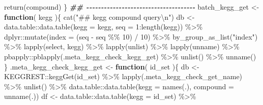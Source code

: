 \documentclass[
]{article}
\newenvironment{Shaded}{\begin{snugshade}}{\end{snugshade}}
\newcommand{\AttributeTok}[1]{\textcolor[rgb]{0.77,0.63,0.00}{#1}}
\newcommand{\ControlFlowTok}[1]{\textcolor[rgb]{0.13,0.29,0.53}{\textbf{#1}}}
\newcommand{\DecValTok}[1]{\textcolor[rgb]{0.00,0.00,0.81}{#1}}
\newcommand{\DocumentationTok}[1]{\textcolor[rgb]{0.56,0.35,0.01}{\textbf{\textit{#1}}}}
\newcommand{\FunctionTok}[1]{\textcolor[rgb]{0.00,0.00,0.00}{#1}}
\newcommand{\NormalTok}[1]{#1}
\newcommand{\OtherTok}[1]{\textcolor[rgb]{0.56,0.35,0.01}{#1}}
\newcommand{\SpecialCharTok}[1]{\textcolor[rgb]{0.00,0.00,0.00}{#1}}
\newcommand{\StringTok}[1]{\textcolor[rgb]{0.31,0.60,0.02}{#1}}
\begin{document}
\begin{Shaded}
\begin{Highlighting}[]
    \FunctionTok{return}\NormalTok{(compound)}
\NormalTok{  \}}
\DocumentationTok{\#\# {-}{-}{-}{-}{-}{-}{-}{-}{-}{-}{-}{-}{-}{-}{-}{-}{-}{-}{-}{-}{-}{-}{-}{-}{-}{-}{-}{-}{-}{-}{-}{-}{-}{-}{-}{-}{-} }
\NormalTok{batch\_kegg\_get }\OtherTok{\textless{}{-}} 
  \ControlFlowTok{function}\NormalTok{(}
\NormalTok{           kegg}
\NormalTok{           )\{}
    \FunctionTok{cat}\NormalTok{(}\StringTok{"\#\# kegg compound query}\SpecialCharTok{\textbackslash{}n}\StringTok{"}\NormalTok{)}
\NormalTok{    db }\OtherTok{\textless{}{-}}\NormalTok{ data.table}\SpecialCharTok{::}\FunctionTok{data.table}\NormalTok{(}\AttributeTok{kegg =}\NormalTok{ kegg, }\AttributeTok{seq =} \DecValTok{1}\SpecialCharTok{:}\FunctionTok{length}\NormalTok{(kegg)) }\SpecialCharTok{\%\textgreater{}\%} 
\NormalTok{      dplyr}\SpecialCharTok{::}\FunctionTok{mutate}\NormalTok{(}\AttributeTok{index =}\NormalTok{ (seq }\SpecialCharTok{{-}}\NormalTok{ seq }\SpecialCharTok{\%\%} \DecValTok{10}\NormalTok{) }\SpecialCharTok{/} \DecValTok{10}\NormalTok{) }\SpecialCharTok{\%\textgreater{}\%}
      \FunctionTok{by\_group\_as\_list}\NormalTok{(}\StringTok{"index"}\NormalTok{) }\SpecialCharTok{\%\textgreater{}\%}
      \FunctionTok{lapply}\NormalTok{(select, kegg) }\SpecialCharTok{\%\textgreater{}\%} 
      \FunctionTok{lapply}\NormalTok{(unlist) }\SpecialCharTok{\%\textgreater{}\%} 
      \FunctionTok{lapply}\NormalTok{(unname) }\SpecialCharTok{\%\textgreater{}\%} 
\NormalTok{      pbapply}\SpecialCharTok{::}\FunctionTok{pblapply}\NormalTok{(.meta\_kegg\_check\_kegg\_get) }\SpecialCharTok{\%\textgreater{}\%}
      \FunctionTok{unlist}\NormalTok{() }\SpecialCharTok{\%\textgreater{}\%} 
      \FunctionTok{unname}\NormalTok{()}
\NormalTok{  \}}
\NormalTok{.meta\_kegg\_check\_kegg\_get }\OtherTok{\textless{}{-}} 
  \ControlFlowTok{function}\NormalTok{(}
\NormalTok{           id\_set}
\NormalTok{           )\{}
\NormalTok{    db }\OtherTok{\textless{}{-}}\NormalTok{ KEGGREST}\SpecialCharTok{::}\FunctionTok{keggGet}\NormalTok{(id\_set) }\SpecialCharTok{\%\textgreater{}\%} 
      \FunctionTok{lapply}\NormalTok{(.meta\_kegg\_check\_get\_name) }\SpecialCharTok{\%\textgreater{}\%} 
      \FunctionTok{unlist}\NormalTok{() }\SpecialCharTok{\%\textgreater{}\%} 
\NormalTok{      data.table}\SpecialCharTok{::}\FunctionTok{data.table}\NormalTok{(}\AttributeTok{kegg =} \FunctionTok{names}\NormalTok{(.), }\AttributeTok{compound =} \FunctionTok{unname}\NormalTok{(.))}
\NormalTok{    df }\OtherTok{\textless{}{-}}\NormalTok{ data.table}\SpecialCharTok{::}\FunctionTok{data.table}\NormalTok{(}\AttributeTok{kegg =}\NormalTok{ id\_set) }\SpecialCharTok{\%\textgreater{}\%} 

\end{Highlighting}
\end{Shaded}
\end{document}
